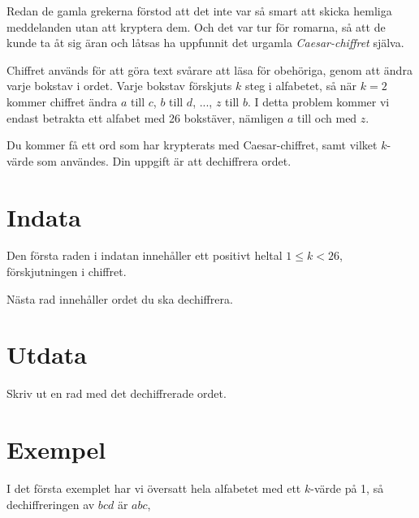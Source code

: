 
Redan de gamla grekerna förstod att det inte var så smart att skicka hemliga meddelanden utan att kryptera dem.
Och det var tur för romarna, så att de kunde ta åt sig äran och låtsas ha uppfunnit det urgamla \emph{Caesar-chiffret} själva.

Chiffret används för att göra text svårare att läsa för obehöriga, genom att ändra varje bokstav i ordet.
Varje bokstav förskjuts $k$ steg i alfabetet, så när $k = 2$ kommer chiffret ändra $a$ till $c$, $b$ till
$d$, ..., $z $ till $b$. I detta problem kommer vi endast betrakta ett alfabet med 26 bokstäver, nämligen $a$ till och med $z$.

Du kommer få ett ord som har krypterats med Caesar-chiffret, samt vilket $k$-värde som användes. Din uppgift är att dechiffrera ordet.

\section*{Indata}
Den första raden i indatan innehåller ett positivt heltal $1 \le k < 26$, förskjutningen i chiffret.

Nästa rad innehåller ordet du ska dechiffrera.

\section*{Utdata}
Skriv ut en rad med det dechiffrerade ordet.

\section*{Exempel}
I det första exemplet har vi översatt hela alfabetet med ett $k$-värde på 1, så dechiffreringen av $bcd$ är $abc$,
